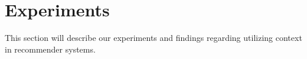 \section{Experiments}
This section will describe our experiments and findings regarding utilizing context in recommender systems.



